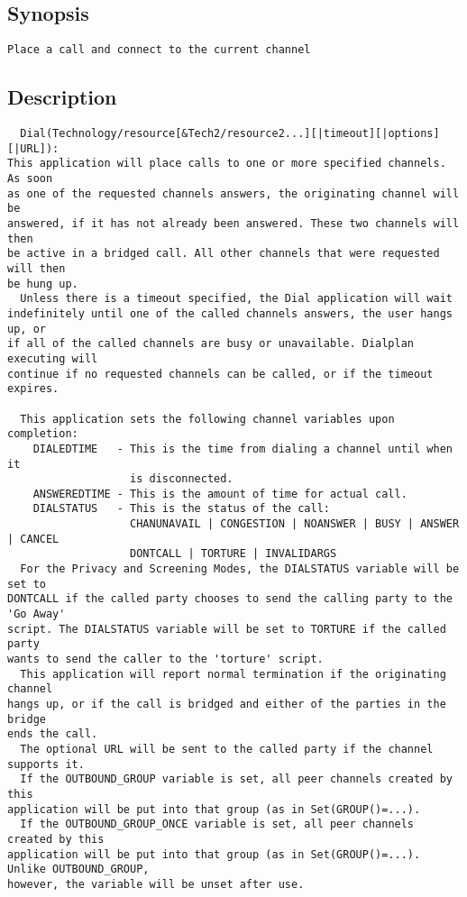 \subsection{Synopsis}
\begin{verbatim}
Place a call and connect to the current channel
\end{verbatim}
\subsection{Description}
\begin{verbatim}
  Dial(Technology/resource[&Tech2/resource2...][|timeout][|options][|URL]):
This application will place calls to one or more specified channels. As soon
as one of the requested channels answers, the originating channel will be
answered, if it has not already been answered. These two channels will then
be active in a bridged call. All other channels that were requested will then
be hung up.
  Unless there is a timeout specified, the Dial application will wait
indefinitely until one of the called channels answers, the user hangs up, or
if all of the called channels are busy or unavailable. Dialplan executing will
continue if no requested channels can be called, or if the timeout expires.

  This application sets the following channel variables upon completion:
    DIALEDTIME   - This is the time from dialing a channel until when it
                   is disconnected.
    ANSWEREDTIME - This is the amount of time for actual call.
    DIALSTATUS   - This is the status of the call:
                   CHANUNAVAIL | CONGESTION | NOANSWER | BUSY | ANSWER | CANCEL
                   DONTCALL | TORTURE | INVALIDARGS
  For the Privacy and Screening Modes, the DIALSTATUS variable will be set to
DONTCALL if the called party chooses to send the calling party to the 'Go Away'
script. The DIALSTATUS variable will be set to TORTURE if the called party
wants to send the caller to the 'torture' script.
  This application will report normal termination if the originating channel
hangs up, or if the call is bridged and either of the parties in the bridge
ends the call.
  The optional URL will be sent to the called party if the channel supports it.
  If the OUTBOUND_GROUP variable is set, all peer channels created by this
application will be put into that group (as in Set(GROUP()=...).
  If the OUTBOUND_GROUP_ONCE variable is set, all peer channels created by this
application will be put into that group (as in Set(GROUP()=...). Unlike OUTBOUND_GROUP,
however, the variable will be unset after use.


\end{verbatim}

